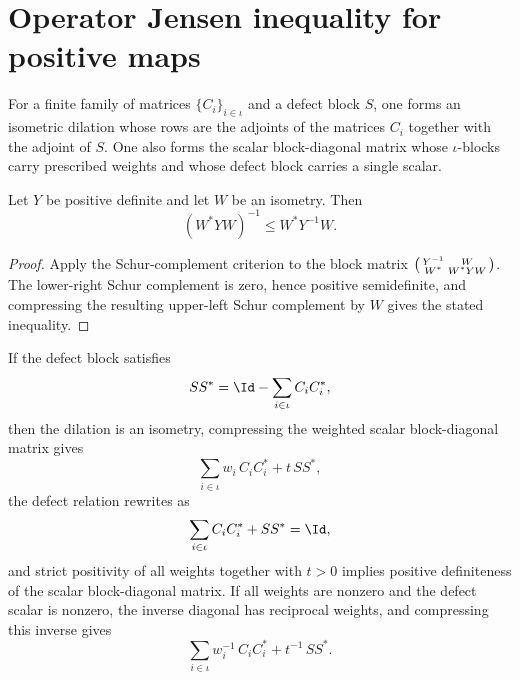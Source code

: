 \section{Operator Jensen inequality for positive maps}

\begin{definition}\label{def:operator_jensen_povm_aux}
    \leanok
    For a finite family of matrices $\{C_i\}_{i \in \iota}$ and a defect block
    $S$, one forms an isometric dilation whose rows are the adjoints of the
    matrices $C_i$ together with the adjoint of $S$. One also forms the scalar
    block-diagonal matrix whose $\iota$-blocks carry prescribed weights and
    whose defect block carries a single scalar.
\end{definition}

\begin{lemma}\label{lem:operator_jensen_inverse_compression}
    \leanok
    Let $Y$ be positive definite and let $W$ be an isometry. Then
    \[
        (W^\ast Y W)^{-1} \le W^\ast Y^{-1} W.
    \]
\end{lemma}

\begin{proof}
    \leanok
    Apply the Schur-complement criterion to the block matrix
    $\begin{psmallmatrix} Y^{-1} & W \\ W^\ast & W^\ast Y W \end{psmallmatrix}$.
    The lower-right Schur complement is zero, hence positive semidefinite, and
    compressing the resulting upper-left Schur complement by $W$ gives the
    stated inequality.
\end{proof}

\begin{lemma}\label{lem:operator_jensen_povm_compression}
    \leanok
    If the defect block satisfies
    \[
        S S^\ast = \Id - \sum_{i \in \iota} C_i C_i^\ast,
    \]
    then the dilation is an isometry, compressing the weighted scalar
    block-diagonal matrix gives
    \[
        \sum_{i \in \iota} w_i\, C_i C_i^\ast + t\, S S^\ast,
    \]
    the defect relation rewrites as
    \[
        \sum_{i \in \iota} C_i C_i^\ast + S S^\ast = \Id,
    \]
    and strict positivity of all weights together with $t>0$ implies positive
    definiteness of the scalar block-diagonal matrix. If all weights are nonzero
    and the defect scalar is nonzero, the inverse diagonal has reciprocal
    weights, and compressing this inverse gives
    \[
        \sum_{i \in \iota} w_i^{-1}\, C_i C_i^\ast + t^{-1}\, S S^\ast.
    \]
\end{lemma}

